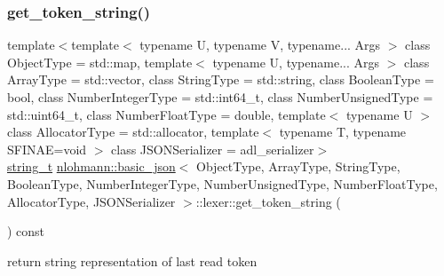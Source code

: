 \subsubsection{\texorpdfstring{get\+\_\+token\+\_\+string()}{get\_token\_string()}}
{\footnotesize\ttfamily template$<$template$<$ typename U, typename V, typename... Args $>$ class Object\+Type = std\+::map, template$<$ typename U, typename... Args $>$ class Array\+Type = std\+::vector, class String\+Type  = std\+::string, class Boolean\+Type  = bool, class Number\+Integer\+Type  = std\+::int64\+\_\+t, class Number\+Unsigned\+Type  = std\+::uint64\+\_\+t, class Number\+Float\+Type  = double, template$<$ typename U $>$ class Allocator\+Type = std\+::allocator, template$<$ typename T, typename S\+F\+I\+N\+A\+E=void $>$ class J\+S\+O\+N\+Serializer = adl\+\_\+serializer$>$ \\
\hyperlink{classnlohmann_1_1basic__json_a61f8566a1a85a424c7266fb531dca005}{string\+\_\+t} \hyperlink{classnlohmann_1_1basic__json}{nlohmann\+::basic\+\_\+json}$<$ Object\+Type, Array\+Type, String\+Type, Boolean\+Type, Number\+Integer\+Type, Number\+Unsigned\+Type, Number\+Float\+Type, Allocator\+Type, J\+S\+O\+N\+Serializer $>$\+::lexer\+::get\+\_\+token\+\_\+string (\begin{DoxyParamCaption}{ }\end{DoxyParamCaption}) const\hspace{0.3cm}{\ttfamily [inline]}}



return string representation of last read token 

\mbox{\label{classnlohmann_1_1basic__json_1_1lexer_aec615034104f3b6b68343f14908df04d}} 
